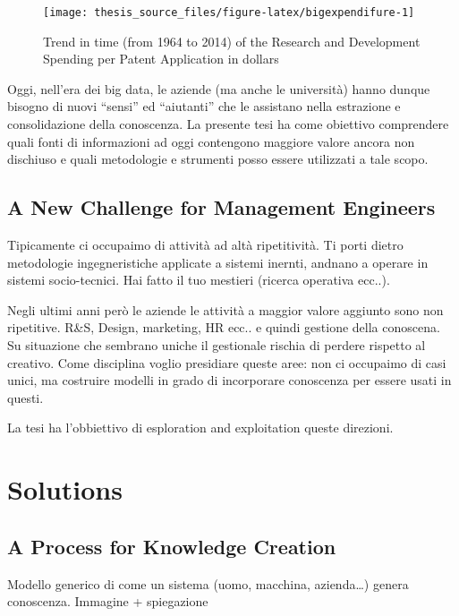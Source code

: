 \documentclass[]{book}
\begin{document}
\begin{figure}

{\centering \texttt{[image: thesis\_source\_files/figure-latex/bigexpendifure-1]} 

}

\caption{Trend in time (from 1964 to 2014) of the Research and Development Spending per Patent Application in dollars}\label{fig:bigexpendifure}
\end{figure}

Oggi, nell'era dei big data, le aziende (ma anche le università) hanno
dunque bisogno di nuovi ``sensi'' ed ``aiutanti'' che le assistano nella
estrazione e consolidazione della conoscenza. La presente tesi ha come
obiettivo comprendere quali fonti di informazioni ad oggi contengono
maggiore valore ancora non dischiuso e quali metodologie e strumenti
posso essere utilizzati a tale scopo.

\section{A New Challenge for Management
Engineers}\label{a-new-challenge-for-management-engineers}

Tipicamente ci occupaimo di attività ad altà ripetitività. Ti porti
dietro metodologie ingegneristiche applicate a sistemi inernti, andnano
a operare in sistemi socio-tecnici. Hai fatto il tuo mestieri (ricerca
operativa ecc..).

Negli ultimi anni però le aziende le attività a maggior valore aggiunto
sono non ripetitive. R\&S, Design, marketing, HR ecc.. e quindi gestione
della conoscena. Su situazione che sembrano uniche il gestionale rischia
di perdere rispetto al creativo. Come disciplina voglio presidiare
queste aree: non ci occupaimo di casi unici, ma costruire modelli in
grado di incorporare conoscenza per essere usati in questi.

La tesi ha l'obbiettivo di esploration and exploitation queste
direzioni.

\chapter{Solutions}\label{solutions}

\section{A Process for Knowledge
Creation}\label{a-process-for-knowledge-creation}

Modello generico di come un sistema (uomo, macchina, azienda\ldots{})
genera conoscenza. Immagine + spiegazione
\end{document}
